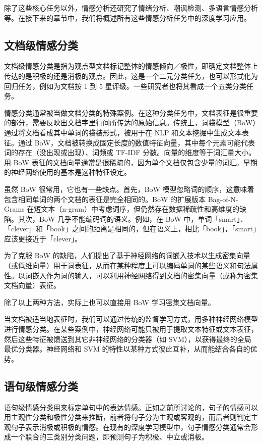 \documentclass[lang=cn,11pt,a4paper]{elegantpaper}
\begin{document}
除了这些核心任务以外，情感分析还研究了情绪分析、嘲讽检测、多语言情感分析等。在接下来的章节中，我们将概述所有这些情感分析任务中的深度学习应用。

\subsection{文档级情感分类}
文档级情感分类是指为观点型文档标记整体的情感倾向／极性，即确定文档整体上传达的是积极的还是消极的观点\cite{12}。因此，这是一个二元分类任务，也可以形式化为回归任务，例如为文档按 1 到 5 星评级。一些研究者也将其看成一个五类分类任务。

情感分类通常被当做文档分类的特殊案例。在这种分类任务中，文档表征是很重要的部分，需要反映出文档字里行间所传达的原始信息。传统上，词袋模型（BoW）通过将文档看成其中单词的袋装形式，被用于在 NLP 和文本挖掘中生成文本表征。通过 BoW，文档被转换成固定长度的数值特征向量，其中每个元素可能代表词的存在（没出现或出现）、词频或 TF-IDF 分数。向量的维度等于词汇量大小。用 BoW 表征的文档向量通常是很稀疏的，因为单个文档仅包含少量的词汇。早期的神经网络使用的基本是这种特征设定。

虽然 BoW 很常用，它也有一些缺点。首先，BoW 模型忽略词的顺序，这意味着包含相同单词的两个文档的表征是完全相同的。BoW 的扩展版本 Bag-of-N-Grams 在短文本（n-gram）中考虑词序，但仍然存在数据稀疏性和高维度的缺陷。其次，BoW 几乎不能编码词的语义。例如，在 BoW 中，单词「smart」、「clever」和「book」之间的距离是相同的，但在语义上，相比「book」，「smart」应该更接近于「clever」。

为了克服 BoW 的缺陷，人们提出了基于神经网络的词嵌入技术以生成密集向量（或低维向量）用于词表征，从而在某种程度上可以编码单词的某些语义和句法属性。以词嵌入作为词的输入，可以利用神经网络得到文档的密集向量（或称为密集文档向量）表征。

除了以上两种方法，实际上也可以直接用 BoW 学习密集文档向量。

当文档被适当地表征时，我们可以通过传统的监督学习方式，用多种神经网络模型进行情感分类。在某些案例中，神经网络可能只被用于提取文本特征或文本表征，然后这些特征被馈送到其它非神经网络的分类器（如 SVM），以获得最终的全局最优分类器。神经网络和 SVM 的特性以某种方式彼此互补，从而能结合各自的优势。

\subsection{语句级情感分类}
语句级情感分类用来标定单句中的表达情感\cite{13}。正如之前所讨论的，句子的情感可以用主观性分类和极性分类来推断，前者将句子分为主观或客观的，而后者则判定主观句子表示消极或积极的情感。在现有的深度学习模型中，句子情感分类通常会形成一个联合的三类别分类问题，即预测句子为积极、中立或消极。
\end{document}
